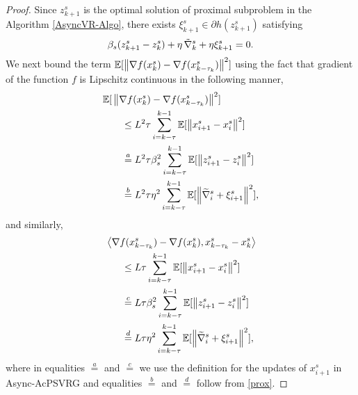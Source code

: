 \begin{proof}
Since $z_{k+1}^s$ is the optimal solution of proximal subproblem in the Algorithm \ref{AsyncVR-Algo}, there exists ${\xi}_{k+1}^s\in\partial h(z_{k+1}^s)$ satisfying
\begin{equation}\label{prox}
{\beta_s}(z_{k+1}^s - z_{k}^s) + \eta\,\tilde{\nabla}_k^s + \eta{\xi}_{k+1}^s = 0.
\end{equation}
We next bound the term $\mathbb{E}[\left\lVert\nabla f(x_{k}^s)-\nabla f(x_{k-\tau_k}^s)\right\rVert^2]$ using the fact that gradient of the function $f$ is Lipschitz continuous in the following manner,
\begin{equation}\label{Eq5-Lemma1}
\begin{split}
\mathbb{E}[&\left\lVert\nabla f(x_{k}^s)-\nabla f(x_{k-\tau_k}^s)\right\rVert^2]\\
&~~~\leq L^2\tau \sum_{i = k-\tau}^{k-1}\mathbb{E}[\left\lVert x_{i+1}^s-x_{i}^s\right\rVert^2]\\
&~~~\stackrel{a}{=} L^2\tau\beta_s^2\sum_{i = k-\tau}^{k-1}\mathbb{E}[\left\lVert z_{i+1}^s-z_{i}^s\right\rVert^2] \\
&~~~\stackrel{b}{=} { L^2\tau\eta^2\sum_{i = k-\tau}^{k-1}\mathbb{E}[\left\lVert\widetilde{\nabla}_{i}^s+{\xi}_{i+1}^s\right\rVert^2]},
\end{split}
\end{equation}
and similarly,
\begin{equation}\label{Eq5p-Lemma1}
\begin{split}
&\left\langle \nabla f(x_{k-\tau_k}^s)-\nabla f(x_{k}^s),x_{k-\tau_k}^s-{x}^{s}_{k}\right\rangle\\
&~~~~~\leq L\tau \sum_{i = k-\tau}^{k-1}\mathbb{E}[\left\lVert x_{i+1}^s-x_{i}^s\right\rVert^2]\\
&~~~~~\stackrel{c}{=} L\tau\beta_s^2\sum_{i = k-\tau}^{k-1}\mathbb{E}[\left\lVert z_{i+1}^s-z_{i}^s\right\rVert^2] \\
&~~~~~\stackrel{d}{=}  L\tau\eta^2\sum_{i = k-\tau}^{k-1}\mathbb{E}[\left\lVert\widetilde{\nabla}_{i}^s+{\xi}_{i+1}^s\right\rVert^2],
\end{split}
\end{equation}
where in equalities $\stackrel{a}{=}$ and  $\stackrel{c}{=}$ we use the definition for the updates of $x_{i+1}^s$ in Async-AcPSVRG and equalities $\stackrel{b}{=}$ and $\stackrel{d}{=}$ follow from \eqref{prox}.


\end{proof}
